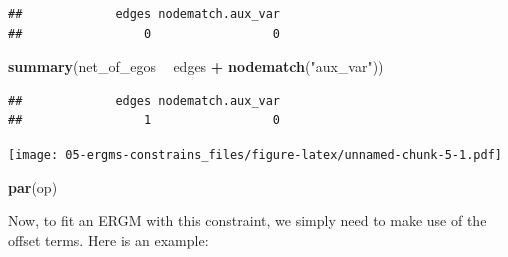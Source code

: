 \documentclass[]{book}
\newenvironment{Shaded}{\begin{snugshade}}{\end{snugshade}}
\newcommand{\CommentTok}[1]{\textcolor[rgb]{0.56,0.35,0.01}{\textit{#1}}}
\newcommand{\DataTypeTok}[1]{\textcolor[rgb]{0.13,0.29,0.53}{#1}}
\newcommand{\DecValTok}[1]{\textcolor[rgb]{0.00,0.00,0.81}{#1}}
\newcommand{\KeywordTok}[1]{\textcolor[rgb]{0.13,0.29,0.53}{\textbf{#1}}}
\newcommand{\NormalTok}[1]{#1}
\newcommand{\OperatorTok}[1]{\textcolor[rgb]{0.81,0.36,0.00}{\textbf{#1}}}
\newcommand{\StringTok}[1]{\textcolor[rgb]{0.31,0.60,0.02}{#1}}
\begin{document}
\begin{verbatim}
##             edges nodematch.aux_var 
##                 0                 0
\end{verbatim}

\begin{Shaded}
\begin{Highlighting}[]
\KeywordTok{summary}\NormalTok{(net_of_egos }\OperatorTok{~}\StringTok{ }\NormalTok{edges }\OperatorTok{+}\StringTok{ }\KeywordTok{nodematch}\NormalTok{(}\StringTok{"aux_var"}\NormalTok{))}
\end{Highlighting}
\end{Shaded}

\begin{verbatim}
##             edges nodematch.aux_var 
##                 1                 0
\end{verbatim}

\begin{Shaded}
\end{Shaded}

\texttt{[image: 05-ergms-constrains\_files/figure-latex/unnamed-chunk-5-1.pdf]}

\begin{Shaded}
\begin{Highlighting}[]
\KeywordTok{par}\NormalTok{(op)}
\end{Highlighting}
\end{Shaded}

Now, to fit an ERGM with this constraint, we simply need to make use of
the offset terms. Here is an example:
\end{document}
